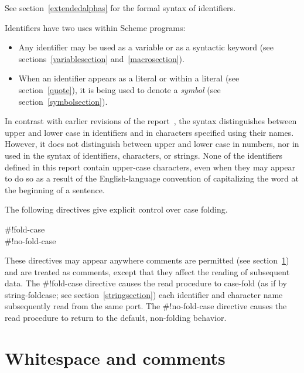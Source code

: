 See section~\ref{extendedalphas} for the formal syntax of identifiers.

\vest Identifiers have two uses within Scheme programs:
\begin{itemize}
\item Any identifier may be used as a variable
 or as a syntactic keyword
(see sections~\ref{variablesection} and~\ref{macrosection}).

\item When an identifier appears as a literal or within a literal
(see section~\ref{quote}), it is being used to denote a {\em symbol}
(see section~\ref{symbolsection}).
\end{itemize}

In contrast with earlier revisions of the report~\cite{R5RS}, the
syntax distinguishes between upper and lower case in
identifiers and in characters specified using their names.  However, it
does not distinguish between upper and lower case in numbers,
nor in  used
in the syntax of identifiers, characters, or strings.
None of the identifiers defined in this report contain upper-case
characters, even when they may appear to do so as a result
of the English-language convention of capitalizing the word at
the beginning of a sentence.

The following directives give explicit control over case
folding.

\begin{entry}{%
{\cf{}\#!fold-case}\\
{\cf{}\#!no-fold-case}}

These directives may appear anywhere comments are permitted (see
section~\ref{wscommentsection})
and are treated as comments, except that they affect the reading
of subsequent data. The {\cf{}\#!fold-case} directive causes
the {\cf read} procedure to case-fold (as if by {\cf string-foldcase};
see section~\ref{stringsection}) each identifier and character name
subsequently read from the same port. The {\cf{}\#!no-fold-case} directive
causes the {\cf read} procedure to return to the default, non-folding behavior.
\end{entry}



\section{Whitespace and comments}
\label{wscommentsection}


